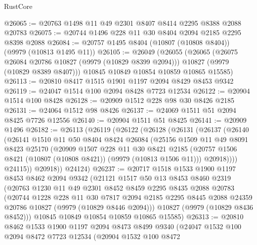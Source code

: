 \begin{lexlean}{RustCore}
\begin{coremodule}
@26065 := @20763 @1498 @11 @49 @2301 @8407 @8414 @2295 @8388 @2088 @20783
@26075 := @20744 @1496 @228 @11 @30 @8404 @2094 @2185 @2295 @8398 @2088
@26084 := @20757 @1495 @8404 (@10807 (@10808 @8404)) (@9979 (@10813 @1495 @11))
@26105 := @26049
    (@26055
      (@26065
        (@26075 @26084 @20786 @10827 (@9979 (@10829 @8399 @2094)))
        @10827
        (@9979 (@10829 @8389 @8407)))
      @10845
      @10849
      @10854
      @10859
      @10865
      @15585)
@26113 := @20810 @8417 @1515 @1901 @1197 @2094 @8429 @8453 @9342
@26119 := @24047 @1514 @100 @2094 @8428 @7723 @12534
@26122 := @20904 @1514 @100 @8428
@26128 := @20909 @1512 @228 @98 @30 @8426 @2185
@26131 := @24064 @1512 @98 @8426
@26137 := @24069 @1511 @51 @2094 @8425 @7726 @12556
@26140 := @20904 @1511 @51 @8425
@26141 := @20909 @1496
@26182 := @26113
    (@26119
      (@26122
        (@26128
          (@26131
            (@26137
              (@26140
                (@26141
                  @1510
                  @11
                  @50
                  @8404
                  @8424
                  @26084
                  (@25156
                    @1509
                    @11
                    @49
                    @8091
                    @8423
                    @25170
                    (@20909
                      @1507
                      @228
                      @11
                      @30
                      @8421
                      @2185
                      (@20757 @1506 @8421 (@10807 (@10808 @8421)) (@9979 (@10813 @1506 @11)))
                      @20918))))
              @24115))
          @20918))
      @24124)
@26237 := @20717
    @1518
    @1533
    @1900
    @1197
    @8453
    @8462
    @2094
    @9342
    (@21121
      @1517
      @50
      @13
      @8453
      @8460
      @2319
      (@20763
        @1230
        @11
        @49
        @2301
        @8452
        @8459
        @2295
        @8435
        @2088
        @20783
        (@20744
          @1228
          @228
          @11
          @30
          @7817
          @2094
          @2185
          @2295
          @8445
          @2088
          @24359
          @20786
          @10827
          (@9979 (@10829 @8446 @2094)))
        @10827
        (@9979 (@10829 @8436 @8452)))
      @10845
      @10849
      @10854
      @10859
      @10865
      @15585)
@26313 := @20810
    @8462
    @1533
    @1900
    @1197
    @2094
    @8473
    @8499
    @9340
    (@24047
      @1532
      @100
      @2094
      @8472
      @7723
      @12534
      (@20904
        @1532
        @100
        @8472

\end{coremodule}
\end{lexlean}
